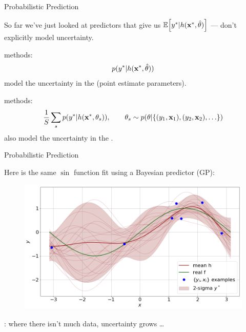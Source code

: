 \documentclass[lualatex, aspectratio=169]{beamer}
\begin{document}
\begin{frame}{Probabilistic Prediction}

  So far we've just looked at predictors that give us $\mathbb{E}\!\left[{{y}^{*} | h({\mathbf{x}}^{*}, \hat\theta)}\right]$ --- don't explicitly model uncertainty.

  \begin{description}[\leftmargin=0cm]
    \item[Maximum Likelihood] methods:
      \begin{align*}
        p({y}^{*} | h({\mathbf{x}}^{*}, \hat\theta))
      \end{align*}
      model the uncertainty in the  (point estimate parameters).
    \item[Bayesian] methods:
      \begin{align*}
        \frac{1}{S} \sum_s p({y}^{*} | h({\mathbf{x}}^{*}, \theta_s)),
          \qquad \theta_s \sim p(\theta | \{(y_1, \mathbf{x}_1), (y_2, \mathbf{x}_2), \ldots \})
      \end{align*}
      also model the uncertainty in the .
  \end{description}
\end{frame}


\begin{frame}{Probabilistic Prediction}

  Here is the same $\sin$ function fit using a Bayesian predictor (GP):
  \begin{figure}
    \includegraphics[width=0.6\pagewidth]{assets/probabilistic.png}
  \end{figure}
  : where there isn't much data, uncertainty grows \ldots

\end{frame}
\end{document}
